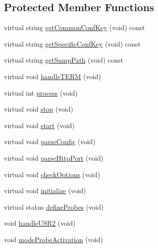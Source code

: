 \subsection*{Protected Member Functions}
\begin{DoxyCompactItemize}
\item 
virtual string \hyperlink{classxtd_1_1servers_1_1app_1_1HttpServer_a3c838a2599ff485454ca19790ae0529c}{get\-Common\-Conf\-Key} (void) const 
\item 
virtual string \hyperlink{classxtd_1_1servers_1_1app_1_1HttpServer_a2b8fdc59d125cae41a833da5daf16d97}{get\-Specific\-Conf\-Key} (void) const 
\item 
virtual string \hyperlink{classxtd_1_1servers_1_1app_1_1HttpServer_affc53261a7c36873c73a06013d6b1fe6}{get\-Snmp\-Path} (void) const 
\item 
virtual void \hyperlink{classxtd_1_1servers_1_1app_1_1HttpServer_a022eecad815296f1d27b19a4b6cca908}{handle\-T\-E\-R\-M} (void)
\item 
virtual int \hyperlink{classxtd_1_1servers_1_1app_1_1HttpServer_a2b52e7d39c3b1937a4802bf7c3d159f8}{process} (void)
\item 
virtual void \hyperlink{classxtd_1_1servers_1_1app_1_1HttpServer_a7fdba08e0fa4dc9bbec30a989ccf4049}{stop} (void)
\item 
virtual void \hyperlink{classxtd_1_1servers_1_1app_1_1HttpServer_a6fac87218bf8d69ef6baeb56819411f9}{start} (void)
\item 
virtual void \hyperlink{classxtd_1_1servers_1_1app_1_1HttpServer_af4baf6c6e7397177a20122e1f1101f9f}{parse\-Config} (void)
\item 
virtual void \hyperlink{classxtd_1_1servers_1_1app_1_1HttpServer_a2b65812ed2afa6629f115b76c4ab6e41}{parse\-Http\-Port} (void)
\item 
virtual void \hyperlink{classxtd_1_1servers_1_1app_1_1HttpServer_a381e3736b9c8fa89891da50b29ad8ae9}{check\-Options} (void)
\item 
virtual void \hyperlink{classxtd_1_1servers_1_1app_1_1HttpServer_a0924e53b6bc9de7563c33690d619ce9d}{initialize} (void)
\item 
virtual status \hyperlink{classxtd_1_1servers_1_1app_1_1HttpServer_a66c2a3b5bca8390d96b35daebfccabf3}{define\-Probes} (void)
\item 
void \hyperlink{classxtd_1_1servers_1_1app_1_1HttpServer_a6c6bb7c70218f171e327ed2197d0f6dc}{handle\-U\-S\-R2} (void)
\item 
void \hyperlink{classxtd_1_1servers_1_1app_1_1HttpServer_a4b2a904b65659aa4e5d67d1ad4a02603}{mode\-Probe\-Activation} (void)

\end{DoxyCompactItemize}
